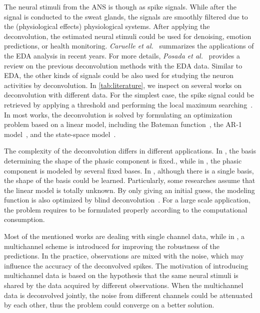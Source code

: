 \documentclass[10pt,conference]{ieeeconf}
\begin{document}
The neural stimuli from the ANS is though as spike signals. While after the signal is conducted to the sweat glands, the signals are smoothly filtered due to the (physiological effects) physiological systems. After applying the deconvolution, the estimated neural stimuli could be used for denoising, emotion predictions, or health monitoring. \textit{Caruelle et al.}~\cite{caruelle2019use} summarizes the applications of the EDA analysis in recent years. For more details, \textit{Posada et al.}~\cite{posada2020innovations} provides a review on the previous deconvolution methods with the EDA data. Similar to EDA, the other kinds of signals could be also used for studying the neuron activities by deconvolution. In \cref{tab:literature}, we inspect on several works on deconvolution with different data. For the simplest case, the spike signal could be retrieved by applying a threshold and performing the local maximum searching~\cite{kaur2016remote,subramanian2019systematic}. In most works, the deconvolution is solved by formulating an optimization problem based on a linear model, including the Bateman function~\cite{savazzi2019estimation,greco2014electrodermal,greco2015cvxeda,amin2019tonic,hernando2017feature,wickramasuriya2019skin}, the AR-1 model~\cite{friedrich2017fast}, and the state-space model~\cite{kazemipour2017fast,amin2019robust}. 

The complexity of the deconvolution differs in different applications. In \cite{greco2015cvxeda}, the basis determining the shape of the phasic component is fixed., while in \cite{hernando2017feature}, the phasic component is modeled by several fixed bases. In \cite{greco2014electrodermal,amin2019tonic,wickramasuriya2019skin,kazemipour2017fast,amin2019robust}, although there is a single basis, the shape of the basis could be learned. Particularly, some researches assume that the linear model is totally unknown. By only giving an initial guess, the modeling function is also optimized by blind deconvolution~\cite{kaur2016remote,friedrich2017fast}. For a large scale application, the problem requires to be formulated properly according to the computational consumption.

Most of the mentioned works are dealing with single channel data, while in \cite{friedrich2017fast,amin2019robust}, a multichannel scheme is introduced for improving the robustness of the predictions. In the practice, observations are mixed with the noise, which may influence the accuracy of the deconvolved spikes. The motivation of introducing multichannel data is based on the hypothesis that the same neural stimuli is shared by the data acquired by different observations. When the multichannel data is deconvolved jointly, the noise from different channels could be attenuated by each other, thus the problem could converge on a better solution.
\end{document}
